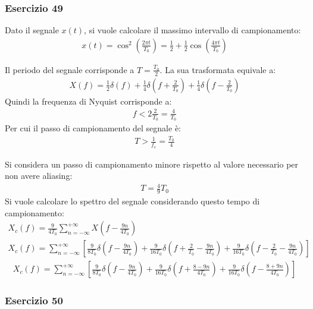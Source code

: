 \documentclass{article}
\begin{document}
\subsubsection*{Esercizio 49}

Dato il segnale $x(t)$, si vuole calcolare il massimo intervallo di campionamento:
\begin{gather*}
    x(t)=\cos^2\left(\displaystyle\frac{2\pi t}{T_0}\right)=\frac{1}{2}+\frac{1}{2}\cos\left(\frac{4\pi t}{T_0}\right)
\end{gather*}

Il periodo del segnale corrisponde a $T=\displaystyle\frac{T_0}{2}$. La sua trasformata equivale a:
\begin{gather*}
    X(f)=\displaystyle\frac{1}{2}\delta(f)+\frac{1}{4}\delta\left(f+\frac{2}{T_0}\right)+\frac{1}{4}\delta\left(f-\frac{2}{T_0}\right)
\end{gather*}
Quindi la frequenza di Nyquist corrisponde a:
\begin{gather*}
    f<2\frac{2}{T_0}=\frac{4}{T_0}
\end{gather*}
Per cui il passo di campionamento del segnale è:
\begin{gather}
    T>\displaystyle\frac{1}{f_c}=\frac{T_0}{4}
\end{gather}

Si considera un passo di campionamento minore rispetto al valore necessario per non avere aliasing: 
\begin{gather*}
    T=\frac{4}{9}T_0
\end{gather*}
Si vuole calcolare lo spettro del segnale considerando questo tempo di campionamento:
\begin{gather*}
    X_c(f)=\displaystyle\frac{9}{4T_0}\sum_{n=-\infty}^{+\infty}X\left(f-\frac{9n}{4T_0}\right)\\
    X_c(f)=\sum_{n=-\infty}^{+\infty}\left[\frac{9}{8T_0}\delta\left(f-\frac{9n}{4T_0}\right)+\frac{9}{16T_0}\delta\left(f+\frac{2}{T_0}-\frac{9n}{4T_0}\right)+\frac{9}{16T_0}\delta\left(f-\frac{2}{T_0}-\frac{9n}{4T_0}\right)\right]
\end{gather*}
\begin{gather}
    X_c(f)=\displaystyle\sum_{n=-\infty}^{+\infty}\left[\frac{9}{8T_0}\delta\left(f-\frac{9n}{4T_0}\right)+\frac{9}{16T_0}\delta\left(f+\frac{8-9n}{4T_0}\right)+\frac{9}{16T_0}\delta\left(f-\frac{8+9n}{4T_0}\right)\right]
\end{gather}

\subsubsection*{Esercizio 50}
\end{document}

